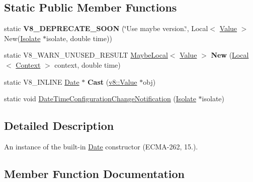 \subsection*{Static Public Member Functions}
\begin{DoxyCompactItemize}
\item 
static {\bfseries V8\+\_\+\+D\+E\+P\+R\+E\+C\+A\+T\+E\+\_\+\+S\+O\+ON} (\char`\"{}Use maybe version.\char`\"{}, Local$<$ \hyperlink{classv8_1_1Value}{Value} $>$ New(\hyperlink{classv8_1_1Isolate}{Isolate} $\ast$isolate, double time))\hypertarget{classv8_1_1Date_a4537a2f3b7de01ccc40784923ccece11}{}\label{classv8_1_1Date_a4537a2f3b7de01ccc40784923ccece11}

\item 
static V8\+\_\+\+W\+A\+R\+N\+\_\+\+U\+N\+U\+S\+E\+D\+\_\+\+R\+E\+S\+U\+LT \hyperlink{classv8_1_1MaybeLocal}{Maybe\+Local}$<$ \hyperlink{classv8_1_1Value}{Value} $>$ {\bfseries New} (\hyperlink{classv8_1_1Local}{Local}$<$ \hyperlink{classv8_1_1Context}{Context} $>$ context, double time)\hypertarget{classv8_1_1Date_a07639d26ad5bc9564c2411a1c14f7d70}{}\label{classv8_1_1Date_a07639d26ad5bc9564c2411a1c14f7d70}

\item 
static V8\+\_\+\+I\+N\+L\+I\+NE \hyperlink{classv8_1_1Date}{Date} $\ast$ {\bfseries Cast} (\hyperlink{classv8_1_1Value}{v8\+::\+Value} $\ast$obj)\hypertarget{classv8_1_1Date_a8e5ea7c1f28924b82922270d6596b4d3}{}\label{classv8_1_1Date_a8e5ea7c1f28924b82922270d6596b4d3}

\item 
static void \hyperlink{classv8_1_1Date_adb084ec0683d3d195ad0f78af5f6f72b}{Date\+Time\+Configuration\+Change\+Notification} (\hyperlink{classv8_1_1Isolate}{Isolate} $\ast$isolate)
\end{DoxyCompactItemize}


\subsection{Detailed Description}
An instance of the built-\/in \hyperlink{classv8_1_1Date}{Date} constructor (E\+C\+M\+A-\/262, 15.). 

\subsection{Member Function Documentation}
